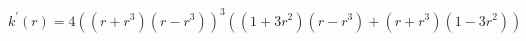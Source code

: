 $ \displaystyle k^{\prime}(r) = 4((r + r^3)(r - r^3))^3 \left((1 + 3r^2)(r - r^3) + (r + r^3)(1 - 3r^2)\right) $